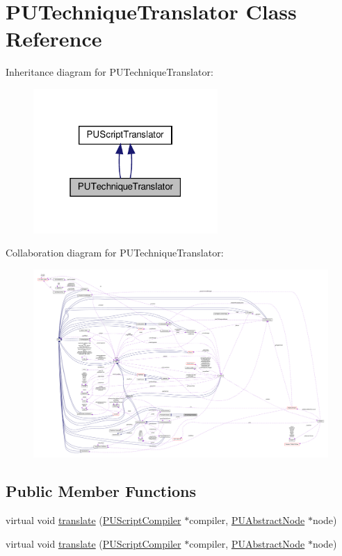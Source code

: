\hypertarget{classPUTechniqueTranslator}{}\section{P\+U\+Technique\+Translator Class Reference}
\label{classPUTechniqueTranslator}


Inheritance diagram for P\+U\+Technique\+Translator\+:
\nopagebreak
\begin{figure}[H]
\begin{center}
\leavevmode
\includegraphics[width=199pt]{classPUTechniqueTranslator__inherit__graph}
\end{center}
\end{figure}


Collaboration diagram for P\+U\+Technique\+Translator\+:
\nopagebreak
\begin{figure}[H]
\begin{center}
\leavevmode
\includegraphics[width=350pt]{classPUTechniqueTranslator__coll__graph}
\end{center}
\end{figure}
\subsection*{Public Member Functions}
\begin{DoxyCompactItemize}
\item 
virtual void \hyperlink{classPUTechniqueTranslator_ac756b8f5359ef77b6cb8f7f6b17e4104}{translate} (\hyperlink{classPUScriptCompiler}{P\+U\+Script\+Compiler} $\ast$compiler, \hyperlink{classPUAbstractNode}{P\+U\+Abstract\+Node} $\ast$node)
\item 
virtual void \hyperlink{classPUTechniqueTranslator_ae8b399fbf75bebaa1b1b76e57a186f3d}{translate} (\hyperlink{classPUScriptCompiler}{P\+U\+Script\+Compiler} $\ast$compiler, \hyperlink{classPUAbstractNode}{P\+U\+Abstract\+Node} $\ast$node)
\end{DoxyCompactItemize}
